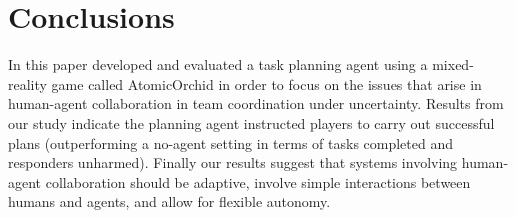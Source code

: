 \section{Conclusions}\label{sec:conclusions}
\noindent In this paper developed and evaluated a task planning agent using a mixed-reality game  called AtomicOrchid in order to focus on the issues that arise in human-agent collaboration in team coordination under uncertainty. Results from our study indicate  the planning agent instructed players to carry out successful plans (outperforming a no-agent setting in terms of tasks completed and responders unharmed). Finally our results  suggest that systems involving human-agent collaboration should be adaptive, involve simple  interactions between humans and agents, and allow for flexible autonomy. 
